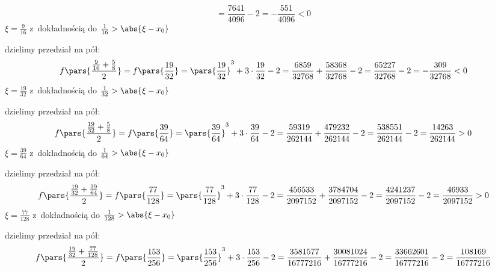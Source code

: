 \begin{proofcases}
\begin{equation*}
                = \frac{7641}{4096} - 2
                = -\frac{551}{4096}
                < 0
        \end{equation*}
        \(\xi = \frac{9}{16}\) z~dokładnością do \(\frac{1}{16} > \abs{\xi - x_0}\)
    \item dzielimy przedział na pół:
        \begin{equation}
            f\pars{\frac{\frac{9}{16} + \frac{5}{8}}{2}}
                = f\pars{\frac{19}{32}}
                = \pars{\frac{19}{32}}^3 + 3 \cdot \frac{19}{32} - 2
                = \frac{6859}{32768} + \frac{58368}{32768} - 2
                = \frac{65227}{32768} - 2
                = -\frac{309}{32768}
                < 0
        \end{equation}
        \(\xi = \frac{19}{32}\) z~dokładnością do \(\frac{1}{32} > \abs{\xi - x_0}\)
    \item dzielimy przedział na pół:
        \begin{equation*}
            f\pars{\frac{\frac{19}{32} + \frac{5}{8}}{2}}
                = f\pars{\frac{39}{64}}
                = \pars{\frac{39}{64}}^3 + 3 \cdot \frac{39}{64} - 2
                = \frac{59319}{262144} + \frac{479232}{262144} - 2
                = \frac{538551}{262144} - 2
                = \frac{14263}{262144}
                > 0
        \end{equation*}
        \(\xi = \frac{39}{64}\) z~dokładnością do \(\frac{1}{64} > \abs{\xi - x_0}\)
    \item dzielimy przedział na pół:
        \begin{equation*}
            f\pars{\frac{\frac{19}{32} + \frac{39}{64}}{2}}
                = f\pars{\frac{77}{128}}
                = \pars{\frac{77}{128}}^3 + 3 \cdot \frac{77}{128} - 2
                = \frac{456533}{2097152} + \frac{3784704}{2097152} - 2
                = \frac{4241237}{2097152} - 2
                = \frac{46933}{2097152}
                > 0
        \end{equation*}
        \(\xi = \frac{77}{128}\) z~dokładnością do \(\frac{1}{128} > \abs{\xi - x_0}\)
    \item dzielimy przedział na pół:
        \begin{equation*}
            f\pars{\frac{\frac{19}{32} + \frac{77}{128}}{2}}
                = f\pars{\frac{153}{256}}
                = \pars{\frac{153}{256}}^3 + 3 \cdot \frac{153}{256} - 2
                = \frac{3581577}{16777216} + \frac{30081024}{16777216} - 2
                = \frac{33662601}{16777216} - 2
                = \frac{108169}{16777216}

\end{equation*}
\end{proofcases}
